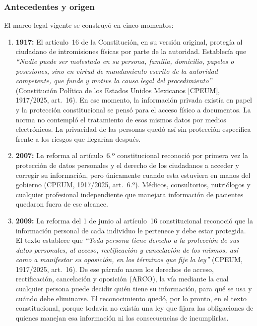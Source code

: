\documentclass[12pt, a4paper]{article}
\begin{document}
\subsubsection{Antecedentes y origen}
 
El marco legal vigente se construyó en cinco momentos:
 
\begin{enumerate}[label=\Roman*.]
 
  \item \textbf{1917:} El artículo~16 de la Constitución, en su
  versión original, protegía al ciudadano de intromisiones físicas
  por parte de la autoridad. Establecía que \textit{``Nadie puede ser
  molestado en su persona, familia, domicilio, papeles o posesiones,
  sino en virtud de mandamiento escrito de la autoridad competente,
  que funde y motive la causa legal del procedimiento''} (Constitución
  Política de los Estados Unidos Mexicanos [CPEUM], 1917/2025,
  art.~16). En ese momento, la información privada existía en papel
  y la protección constitucional se pensó para el acceso físico a
  documentos. La norma no contempló el tratamiento de esos mismos datos
  por medios electrónicos. La privacidad de las personas quedó así sin
  protección específica frente a los riesgos que llegarían después.
 
  \item \textbf{2007:} La reforma al artículo~6.º constitucional
  reconoció por primera vez la protección de datos personales y el
  derecho de los ciudadanos a acceder y corregir su información,
  pero únicamente cuando esta estuviera en manos del gobierno (CPEUM,
  1917/2025, art.~6.º). Médicos, consultorios, nutriólogos y cualquier
  profesional independiente que manejara información de pacientes
  quedaron fuera de ese alcance.
 
  \item \textbf{2009:} La reforma del 1 de junio al artículo~16
  constitucional reconoció que la información personal de cada
  individuo le pertenece y debe estar protegida. El texto establece
  que \textit{``Toda persona tiene derecho a la protección de sus
  datos personales, al acceso, rectificación y cancelación de los
  mismos, así como a manifestar su oposición, en los términos que
  fije la ley''} (CPEUM, 1917/2025, art.~16). De ese párrafo nacen
  los derechos de acceso, rectificación, cancelación y oposición (ARCO), la vía mediante la cual cualquier persona puede
  decidir quién tiene su información, para qué se usa y cuándo debe
  eliminarse. El reconocimiento quedó, por lo pronto, en el texto
  constitucional, porque todavía no existía una ley que fijara las
  obligaciones de quienes manejan esa información ni las
  consecuencias de incumplirlas.
 

\end{enumerate}
\end{document}
